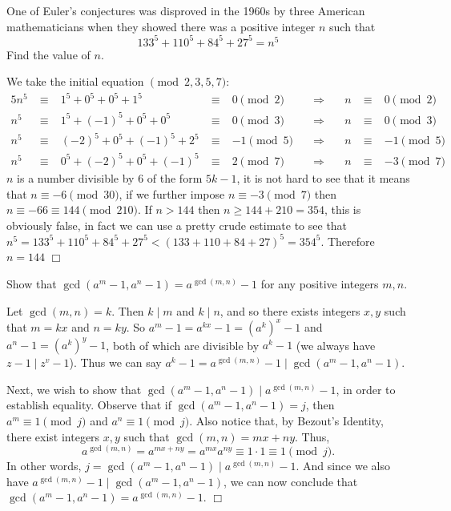 \begin{problem}[M][4][AIME 1989/9]
    One of Euler's conjectures was disproved in the 1960s by three American mathematicians when they showed there was a positive integer $n$ such that
    $$ 133^5 + 110^5 + 84^5 + 27^5 = n^5 $$
    Find the value of $n$.
\end{problem}
\newpageSol
\begin{solution}%
    We take the initial equation $\!\!\!\pmod {2,3,5,7}$:
    \begin{alignat*}{5}
    n^5 &\;\equiv\;& 1^5 + 0^5 + 0^5 + 1^5 
         &\;\equiv\;& 0 \pmod 2
         &\quad \Rightarrow \quad& n 
         &\;\equiv\;& 0 \pmod 2\\
    n^5 &\;\equiv\;& 1^5 + (-1)^5 + 0^5 + 0^5
         &\;\equiv\;& 0 \pmod 3
         &\quad \Rightarrow \quad& n
         &\;\equiv\;& 0 \pmod 3\\
    n^5 &\;\equiv\;& (-2)^5 + 0^5 + (-1)^5 + 2^5
         &\;\equiv\;& -1 \pmod 5
         &\quad \Rightarrow \quad& n
         &\;\equiv\;& -1 \pmod 5\\
    n^5 &\;\equiv\;& 0^5 + (-2)^5 + 0^5 + (-1)^5
         &\;\equiv\;& 2 \pmod 7
         &\quad \Rightarrow \quad& n
         &\;\equiv\;& -3 \pmod 7
    \end{alignat*}
    $n$ is a number divisible by 6 of the form $5k-1$, it is not hard to see that it means that $n \equiv -6 \pmod{30}$, if we further impose $n \equiv -3 \pmod 7$ then $n \equiv -66 \equiv 144 \pmod{ {210}}$. If $n > 144$ then $n \geq 144 + 210 = 354$, this is obviously false, in fact we can use a pretty crude estimate to see that  $n^5 = 133^5 + 110^5 + 84^5 + 27^5 < (133 + 110 + 84 + 27)^5 = 354^5$. Therefore $n = 144$ $\Box$
\end{solution}

\begin{problem}
    Show that $\gcd(a^m-1, a^n-1) = a^{\gcd(m,n)}-1$ for any positive integers $m,n$.
\end{problem}

\begin{solution}
    Let $\gcd(m, n) = k$. Then $k \mid m$ and $k \mid n$, and so there exists integers $x,y$ such that $m = kx$ and $n=ky$. So
    $ a^m - 1 = a^{kx} - 1 = \left(a^k\right)^x - 1 $ and $ a^n - 1 = \left(a^k\right)^y - 1 $, both of which are divisible by $a^{k} -1$ (we always have $z-1 \mid z^v-1$). Thus we can say $a^{k} -1 = a^{\gcd(m,n)}-1 \mid \gcd(a^m-1, a^n-1)$.

    Next, we wish to show that $\gcd(a^m-1, a^n-1) \mid a^{\gcd(m,n)}-1$, in order to establish equality. Observe that if $\gcd(a^m-1, a^n-1) = j$, then $a^m \equiv 1 \pmod j$ and $a^n \equiv 1 \pmod j$. Also notice that, by Bezout's Identity, there exist integers $x,y$ such that $\gcd(m,n)=mx+ny$. Thus,
    \[
        a^{\gcd(m,n)} = a^{mx+ny} = a^{mx}a^{ny} \equiv 1\cdot1\equiv 1 \pmod j.
    \]
    In other words, $j = \gcd(a^m-1, a^n-1) \mid a^{\gcd(m,n)} - 1 $. And since we also have $a^{\gcd(m,n)}-1 \mid \gcd(a^m-1, a^n-1)$, we can now conclude that $\gcd(a^m-1, a^n-1) = a^{\gcd(m,n)} - 1 $. $\Box$
\end{solution} 


